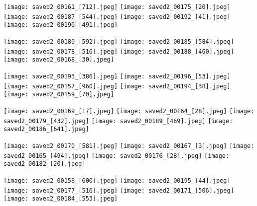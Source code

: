\documentclass[10pt,onecolumn,letterpaper]{article}
\begin{document}
\texttt{[image: saved2\_00161\_[712].jpeg]}
\texttt{[image: saved2\_00175\_[20].jpeg]}
\texttt{[image: saved2\_00187\_[544].jpeg]}
\texttt{[image: saved2\_00192\_[41].jpeg]}
\texttt{[image: saved2\_00190\_[491].jpeg]}

\texttt{[image: saved2\_00180\_[592].jpeg]}
\texttt{[image: saved2\_00185\_[584].jpeg]}
\texttt{[image: saved2\_00178\_[516].jpeg]}
\texttt{[image: saved2\_00188\_[460].jpeg]}
\texttt{[image: saved2\_00168\_[30].jpeg]}

\texttt{[image: saved2\_00193\_[386].jpeg]}
\texttt{[image: saved2\_00196\_[53].jpeg]}
\texttt{[image: saved2\_00157\_[960].jpeg]}
\texttt{[image: saved2\_00194\_[38].jpeg]}
\texttt{[image: saved2\_00159\_[70].jpeg]}

\texttt{[image: saved2\_00169\_[17].jpeg]}
\texttt{[image: saved2\_00164\_[28].jpeg]}
\texttt{[image: saved2\_00179\_[432].jpeg]}
\texttt{[image: saved2\_00189\_[469].jpeg]}
\texttt{[image: saved2\_00186\_[641].jpeg]}

\texttt{[image: saved2\_00170\_[581].jpeg]}
\texttt{[image: saved2\_00167\_[3].jpeg]}
\texttt{[image: saved2\_00165\_[494].jpeg]}
\texttt{[image: saved2\_00176\_[28].jpeg]}
\texttt{[image: saved2\_00182\_[20].jpeg]}

\texttt{[image: saved2\_00158\_[600].jpeg]}
\texttt{[image: saved2\_00195\_[44].jpeg]}
\texttt{[image: saved2\_00177\_[516].jpeg]}
\texttt{[image: saved2\_00171\_[506].jpeg]}
\texttt{[image: saved2\_00184\_[553].jpeg]}


% 
% 
\end{document}
